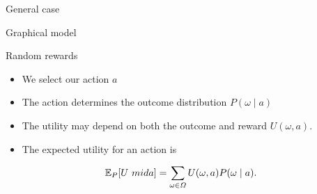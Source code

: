\documentclass[smaller]{beamer}
\begin{document}
\begin{frame}[label={sec:orgb257cd4}]{General case}
\begin{block}{Graphical model}
\begin{center}
\end{center}
\end{block}
\begin{block}{Random rewards}
\begin{itemize}
\item We \alert{select} our action \(a\)
\item The action determines the \alert{outcome} distribution \(P(\omega \mid a)\)
\item The utility may depend on \alert{both} the outcome and reward \(U(\omega, a)\).
\item The \alert{expected utility} for an action is
\end{itemize}
\[
\mathop{\mbox{\ensuremath{\mathbb{E}}}}\nolimits_P[U \ mid a] = \sum_{\omega \in \Omega} U(\omega, a) P(\omega \mid a).
\]
\end{block}
\end{frame}
\end{document}

